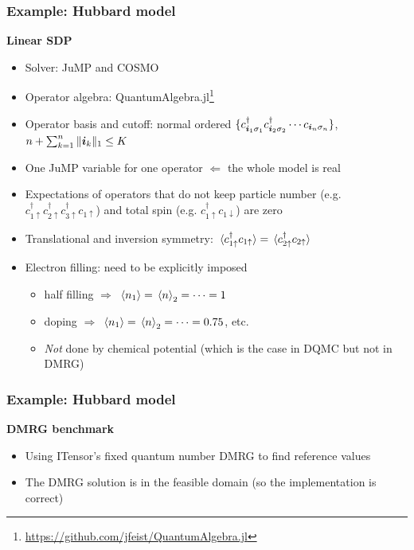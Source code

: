 \documentclass{beamer}
\begin{document}
\begin{frame}
\frametitle{Example: Hubbard model}

\textbf{Linear SDP}

\begin{itemize}
    \item Solver: JuMP and COSMO
    \item Operator algebra: QuantumAlgebra.jl\footnote{\href{https://github.com/jfeist/QuantumAlgebra.jl}{https://github.com/jfeist/QuantumAlgebra.jl}}
    \item Operator basis and cutoff: normal ordered $\{c^\dagger_{\vb*{i}_{1} \sigma_1} c^\dagger_{\vb*{i}_2 \sigma_2} \cdots c_{\vb*{i}_n \sigma_n}\}$, $n + \sum_{k=1}^n \| \vb*{i}_k \|_1 \leq K$
    \item One JuMP variable for one operator $\Leftarrow$ the whole model is real
    \item Expectations of operators that do not keep particle number (e.g. $c^\dagger_{1 \uparrow} c^\dagger_{2\uparrow} c^\dagger_{3\uparrow} c_{1 \uparrow}$) and total spin (e.g. $c^\dagger_{1 \uparrow} c_{1 \downarrow}$) are zero
    \item Translational and inversion symmetry: $\expval*{c_{1 \uparrow}^\dagger c_{1 \uparrow}} = \expval*{c_{2 \uparrow}^\dagger c_{2 \uparrow}}$
    \item Electron filling: need to be explicitly imposed
    \begin{itemize}
        \item half filling $\Rightarrow$ $\expval*{n_1} = \expval*{n}_2 = \cdots = 1$
        \item doping $\Rightarrow$ $\expval*{n_1} = \expval*{n}_2 = \cdots = 0.75$, etc.
        \item \emph{Not} done by chemical potential (which is the case in DQMC but not in DMRG)
    \end{itemize}
\end{itemize}

\end{frame}

\begin{frame}
    \frametitle{Example: Hubbard model}

    \textbf{DMRG benchmark}

    \begin{itemize}
        \item Using ITensor's fixed quantum number DMRG to find reference values
        \item The DMRG solution is in the feasible domain (so the implementation is correct)
    \end{itemize}
\end{frame}
\end{document}
